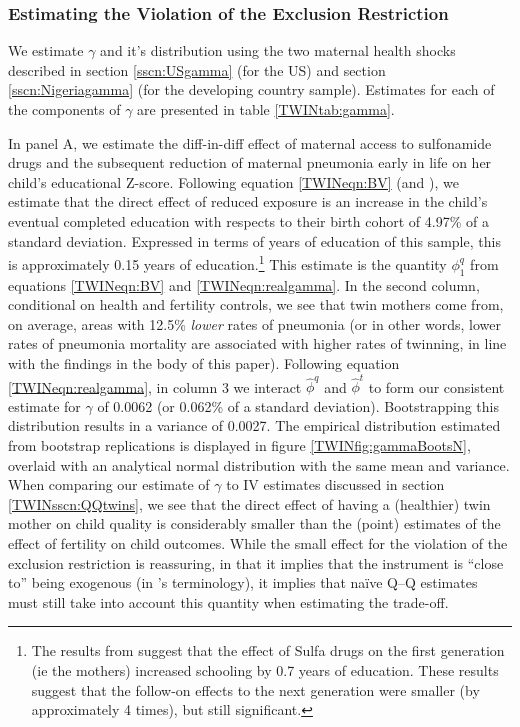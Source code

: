 \documentclass[subeqn]{article}
\begin{document}
\begin{spacing}{1.4}
\subsubsection{Estimating the Violation of the Exclusion Restriction}
We estimate $\gamma$ and it's distribution using the two maternal health
shocks described in section \ref{sscn:USgamma} (for the US) and section
\ref{sscn:Nigeriagamma} (for the developing country sample).  Estimates
for each of the components of $\gamma$ are presented in table
\ref{TWINtab:gamma}.

In panel A, we estimate the diff-in-diff effect of maternal access to
sulfonamide drugs and the subsequent reduction of maternal pneumonia early
in life on her child's educational Z-score.  Following equation
\ref{TWINeqn:BV} (and \citet{BhalotraVenkataramani2014}), we estimate that
the direct effect of reduced exposure is an increase in the child's eventual
completed education with respects to their birth cohort of 4.97\% of a
standard deviation.  Expressed in terms of years of education of this sample,
this is approximately 0.15 years of education.\footnote{The results from
  \citet{BhalotraVenkataramani2014} suggest that the effect of Sulfa drugs
  on the first generation (ie the mothers) increased schooling by 0.7 years
  of education.  These results suggest that the follow-on effects to the next
generation were smaller (by approximately 4 times), but still significant.}
This estimate is the quantity $\phi^q_1$ from equations \ref{TWINeqn:BV} and
\ref{TWINeqn:realgamma}. In the second column, conditional on health and
fertility controls, we see that twin mothers come from, on average, areas
with 12.5\% \emph{lower} rates of pneumonia (or in other words, lower rates
of pneumonia mortality are associated with higher rates of twinning, in line
with the findings in the body of this paper).  Following equation
\ref{TWINeqn:realgamma}, in column 3 we interact $\hat\phi^q$ and $\hat\phi^t$
to form our consistent estimate for $\gamma$ of 0.0062 (or 0.062\% of a
standard deviation).  Bootstrapping this distribution results in a variance
of 0.0027.  The empirical distribution estimated from bootstrap replications
is displayed in figure \ref{TWINfig:gammaBootsN}, overlaid with an
analytical normal distribution with the same mean and variance.  When
comparing our estimate of $\gamma$ to IV estimates discussed in section
\ref{TWINsscn:QQtwins}, we see that the direct effect of having a (healthier)
twin mother on child quality is considerably smaller than the (point)
estimates of the effect of fertility on child outcomes.  While the small
effect for the violation of the exclusion restriction is reassuring, in that
it implies that the instrument is ``close to'' being exogenous (in
\citet{Conleyetal2012}'s terminology), it implies that na\"ive Q--Q estimates
must still take into account this quantity when estimating the trade-off.


\end{spacing}
\end{document}
